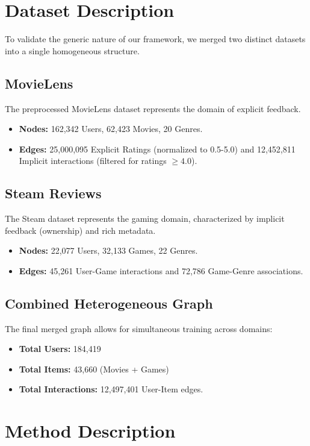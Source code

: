 \documentclass{article}
\begin{document}
\section{Dataset Description}
To validate the generic nature of our framework, we merged two distinct datasets into a single homogeneous structure.

\subsection{MovieLens}
The preprocessed MovieLens dataset represents the domain of explicit feedback.
\begin{itemize}
    \item \textbf{Nodes:} 162,342 Users, 62,423 Movies, 20 Genres.
    \item \textbf{Edges:} 25,000,095 Explicit Ratings (normalized to 0.5-5.0) and 12,452,811 Implicit interactions (filtered for ratings $\geq 4.0$).
\end{itemize}

\subsection{Steam Reviews}
The Steam dataset represents the gaming domain, characterized by implicit feedback (ownership) and rich metadata.
\begin{itemize}
    \item \textbf{Nodes:} 22,077 Users, 32,133 Games, 22 Genres.
    \item \textbf{Edges:} 45,261 User-Game interactions and 72,786 Game-Genre associations.
\end{itemize}

\subsection{Combined Heterogeneous Graph}
The final merged graph allows for simultaneous training across domains:
\begin{itemize}
    \item \textbf{Total Users:} 184,419
    \item \textbf{Total Items:} 43,660 (Movies + Games)
    \item \textbf{Total Interactions:} 12,497,401 User-Item edges.
\end{itemize}

\section{Method Description}
\end{document}
